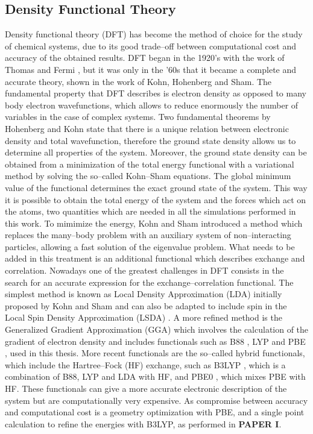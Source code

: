 \subsection*{Density Functional Theory}
Density functional theory (DFT) has become the method of choice for the study of chemical systems, due to its good trade--off between computational cost and accuracy of the obtained results. DFT began in the 1920’s with the work of Thomas and Fermi \cite{Thomas1927, Fermi1928}, but it was only in the ’60s that it became a complete and accurate theory, shown in the work of Kohn, Hohenberg and Sham\cite{Hohenberg1964}. The fundamental property that DFT describes is electron density as opposed to many body electron wavefunctions, which allows to reduce enormously the number of variables in the case of complex systems. Two fundamental theorems by Hohenberg and Kohn state that there is a unique relation between electronic density and total wavefunction, therefore the ground state density allows us to determine all properties of the system. Moreover, the ground state density can be obtained from a minimization of the total energy functional with a variational method by solving the so--called Kohn--Sham equations. The global minimum value of the functional determines the exact ground state of the system. This way it is possible to obtain the total energy of the system and the forces which act on the atoms, two quantities which are needed in all the simulations performed in this work. 
\npar
To mimimize the energy, Kohn and Sham \cite{Kohn1965} introduced a method which replaces the many--body problem with an auxiliary system of non--interacting particles, allowing a fast solution of the eigenvalue problem. What needs to be added in this treatment is an additional functional which describes exchange and correlation. Nowadays one of the greatest challenges in DFT consists in the search for an accurate expression for the exchange--correlation functional.
The simplest method is known as Local Density Approximation (LDA) initially proposed by Kohn and Sham \cite{Kohn1965} and can also be adapted to include spin in the Local Spin Density Approximation (LSDA) \cite{Vosko1980}. A more refined method is the Generalized Gradient Approximation (GGA) which involves the calculation of the gradient of electron density and includes functionals such as B88 \cite{Becke1988}, LYP \cite{Lee1988} and PBE \cite{Perdew1996, Perdew1997}, used in this thesis. 
More recent functionals are the so--called hybrid functionals, which include the Hartree--Fock (HF) exchange, such as B3LYP \cite{Becke1988, Becke1993, Lee1988}, which is a combination of B88, LYP and LDA with HF, and PBE0 \cite{Adamo1999}, which mixes PBE with HF. These functionals can give a more accurate electronic description of the system but are computationally very expensive. As compromise between accuracy and computational cost is a geometry optimization with PBE, and a single point calculation to refine the energies with B3LYP, as performed in \textbf{PAPER I}.

